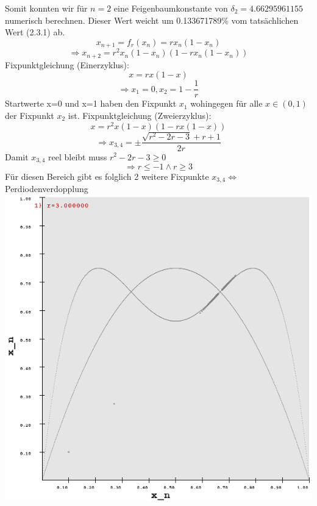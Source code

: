 \documentclass{scrartcl}
\begin{document}
Somit konnten wir für $n=2$ eine Feigenbaumkonstante von $\delta_2=4.66295961155$ numerisch berechnen. Dieser Wert weicht um 0.133671789\% vom tatsächlichen Wert (2.3.1) ab. $$x_{n+1}=f_r(x_n)=rx_n(1-x_n)$$
$$\Rightarrow x_{n+2}=r^2x_n(1-x_n)(1-rx_n(1-x_n))$$
\newline
Fixpunktgleichung (Einerzyklus): 
$$x=rx(1-x)$$
$$\Rightarrow x_1=0, x_2=1-\frac{1}{r}$$
Startwerte x=0 und x=1 haben den Fixpunkt $x_1$ wohingegen für alle $x\in (0,1)$ der Fixpunkt $x_2$ ist.
\newline
Fixpunktgleichung (Zweierzyklus):
$$x=r^2x(1-x)(1-rx(1-x))$$
$$\Rightarrow x_{3,4}=\pm\frac{\sqrt{r^2-2 r-3}+r+1}{2 r}$$
Damit $x_{3,4}$ reel bleibt muss $r^2-2 r-3 \geq 0$
$$\Rightarrow r \leq -1 \land r \geq 3$$
Für diesen Bereich gibt es folglich 2 weitere Fixpunkte $x_{3,4} \Leftrightarrow$ Perdiodenverdopplung 
\newline
\includegraphics[scale=0.3]{r3}
\end{document}
